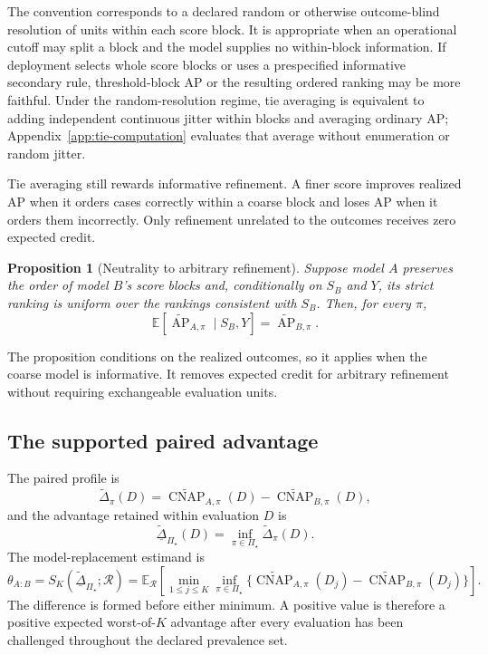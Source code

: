 \documentclass[11pt]{article}
\newcommand{\AP}{\operatorname{AP}}
\newcommand{\CNAP}{\operatorname{CNAP}}
\newcommand{\Regime}{\mathcal{R}}
\newcommand{\PSet}{\Pi_\star}
\newcommand{\E}{\mathbb{E}}
\newcommand{\APta}{\widetilde{\AP}}
\newcommand{\CNAPta}{\widetilde{\CNAP}}
\newcommand{\Dta}{\widetilde{\Delta}}
\newcommand{\RobDta}{\underline{\widetilde{\Delta}}_{\PSet}}
\newtheorem{proposition}{Proposition}
\theoremstyle{remark}
\begin{document}
The convention corresponds to a declared random or otherwise outcome-blind resolution of units within each score block. It is appropriate when an operational cutoff may split a block and the model supplies no within-block information. If deployment selects whole score blocks or uses a prespecified informative secondary rule, threshold-block AP or the resulting ordered ranking may be more faithful. Under the random-resolution regime, tie averaging is equivalent to adding independent continuous jitter within blocks and averaging ordinary AP; Appendix~\ref{app:tie-computation} evaluates that average without enumeration or random jitter.

Tie averaging still rewards informative refinement. A finer score improves realized AP when it orders cases correctly within a coarse block and loses AP when it orders them incorrectly. Only refinement unrelated to the outcomes receives zero expected credit.

\begin{proposition}[Neutrality to arbitrary refinement]
\label{prop:refinement}
Suppose model $A$ preserves the order of model $B$'s score blocks and, conditionally on $S_B$ and $Y$, its strict ranking is uniform over the rankings consistent with $S_B$. Then, for every $\pi$,
\[
\E\!\left[
\APta_{A,\pi}\mid S_B,Y
\right]
=
\APta_{B,\pi}.
\]
\end{proposition}

The proposition conditions on the realized outcomes, so it applies when the coarse model is informative. It removes expected credit for arbitrary refinement without requiring exchangeable evaluation units.

\subsection{The supported paired advantage}

The paired profile is
\[
\Dta_\pi(D)
=
\CNAPta_{A,\pi}(D)
-
\CNAPta_{B,\pi}(D),
\]
and the advantage retained within evaluation $D$ is
\[
\RobDta(D)
=
\inf_{\pi\in\PSet}\Dta_\pi(D).
\]
The model-replacement estimand is
\begin{equation}
\theta_{A:B}
=
S_K(\RobDta;\Regime)
=
\E_{\Regime}
\left[
\min_{1\leq j\leq K}
\inf_{\pi\in\PSet}
\{\CNAPta_{A,\pi}(D_j)-\CNAPta_{B,\pi}(D_j)\}
\right].
\label{eq:paired-estimand}
\end{equation}
The difference is formed before either minimum. A positive value is therefore a positive expected worst-of-$K$ advantage after every evaluation has been challenged throughout the declared prevalence set.
\end{document}
